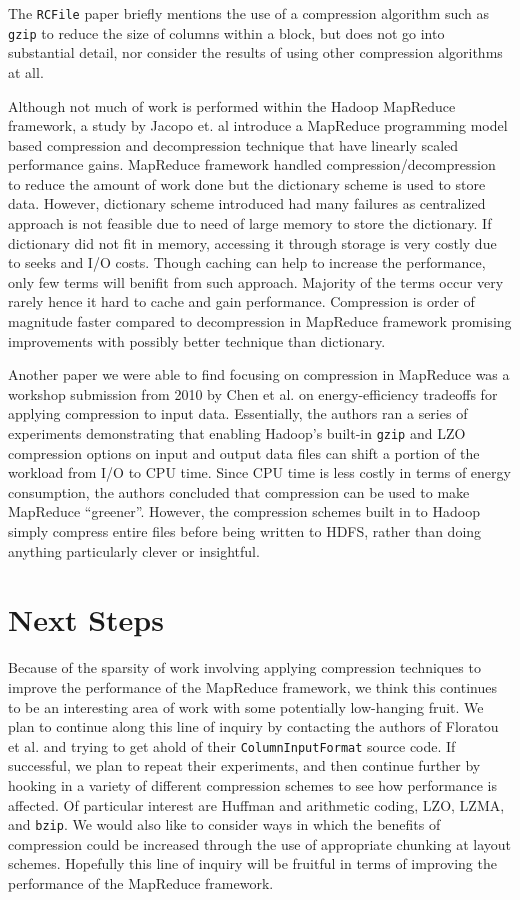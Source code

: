 \documentclass[twocolumn]{article}
\begin{document}
The \verb+RCFile+ paper briefly mentions the use of a compression algorithm
such as \verb+gzip+ to reduce the size of columns within a block, but does
not go into substantial detail, nor consider the results of using other
compression algorithms at all.


Although not much of work is performed within the Hadoop MapReduce framework,
a study by Jacopo et. al \cite{web-compression} introduce a MapReduce programming 
model based compression and decompression technique that have linearly scaled 
performance gains. MapReduce framework handled compression/decompression to reduce
the amount of work done but the dictionary scheme is used to store data. However, 
dictionary scheme introduced had many failures as centralized approach is not 
feasible due to need of large memory to store the dictionary. If dictionary did not 
fit in memory, accessing it through storage is very costly due to seeks and I/O costs.
Though caching can help to increase the performance, only few terms will benifit from 
such approach. Majority of the terms occur very rarely hence it hard to cache and 
gain performance. Compression is order of magnitude faster compared to decompression 
in MapReduce framework promising improvements with possibly better technique than
dictionary.

Another paper we were able to find focusing on compression in MapReduce
was a workshop submission from 2010 by Chen et al. \cite{ref:energy} on
energy-efficiency tradeoffs for applying compression to input data.
Essentially, the authors ran a series of experiments demonstrating that
enabling Hadoop's built-in \verb+gzip+ and LZO compression options
on input and output data files can shift a portion of the workload
from I/O to CPU time.  Since CPU time is less costly in terms of energy
consumption, the authors concluded that compression can be used to make
MapReduce ``greener''.  However, the compression schemes built in to 
Hadoop simply compress entire files before being written to HDFS, rather
than doing anything particularly clever or insightful.

\section{Next Steps}

Because of the sparsity of work involving applying compression techniques
to improve the performance of the MapReduce framework, we think this continues
to be an interesting area of work with some potentially low-hanging fruit.
We plan to continue along this line of inquiry by contacting the authors
of Floratou et al. and trying to get ahold of their \verb+ColumnInputFormat+
source code.  If successful, we plan to repeat their experiments, and then
continue further by hooking in a variety of different compression schemes
to see how performance is affected.  Of particular interest are Huffman
and arithmetic coding, LZO,
LZMA, and \verb+bzip+.  We would also like to consider ways in which
the benefits of compression could be increased through the use of
appropriate chunking at layout schemes.  Hopefully this line of inquiry
will be fruitful in terms of improving the performance of the MapReduce
framework.
\end{document}
